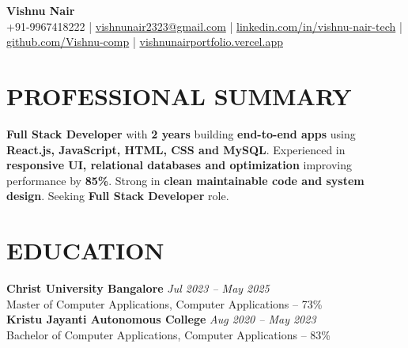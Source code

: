 \documentclass[10pt,a4paper]{article}
\begin{document}

\begin{center}

{\Large \textbf{Vishnu Nair}}\\[4pt]

{\small
+91-9967418222
\quad|\quad
\href{mailto:vishnunair2323@gmail.com}{vishnunair2323@gmail.com}
\quad|\quad
\href{https://linkedin.com/in/vishnu-nair-tech}{linkedin.com/in/vishnu-nair-tech}
\quad|\quad
\href{https://github.com/Vishnu-comp}{github.com/Vishnu-comp}
\quad|\quad
\href{https://vishnunairportfolio.vercel.app}{vishnunairportfolio.vercel.app}
}

\end{center}


\section*{PROFESSIONAL SUMMARY}

\small

\textbf{Full Stack Developer} with \textbf{2 years} building \textbf{end-to-end apps} using \textbf{React.js, JavaScript, HTML, CSS and MySQL}. Experienced in \textbf{responsive UI, relational databases and optimization} improving performance by \textbf{85\%}. Strong in \textbf{clean maintainable code and system design}. Seeking \textbf{Full Stack Developer} role.


\section*{EDUCATION}
\small
\textbf{Christ University Bangalore} \hfill \textit{Jul 2023 -- May 2025}\\
Master of Computer Applications, Computer Applications -- 73\%\\
\small
\textbf{Kristu Jayanti Autonomous College} \hfill \textit{Aug 2020 -- May 2023}\\
Bachelor of Computer Applications, Computer Applications -- 83\%

\end{document}
